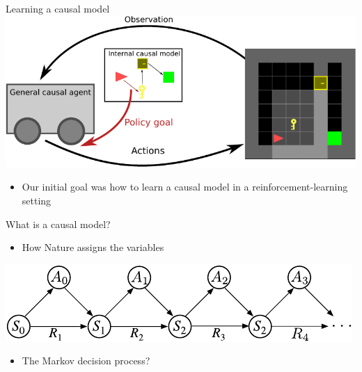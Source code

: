 

\begin{frame}{Learning a causal model}
\includegraphics[width=\linewidth]{causal_figures/conceptA}
\begin{itemize}
\item Our initial goal was how to learn a causal model in a reinforcement-learning setting
\end{itemize}
\end{frame}

\begin{frame}{What is a causal model?}%
\begin{itemize}
\item How Nature assigns the variables \pause
\end{itemize}
\includegraphics[width=\linewidth]{causal_figures/sutton2018_79}
\begin{itemize} 
\item The Markov decision process? 
\end{itemize}
\end{frame}

